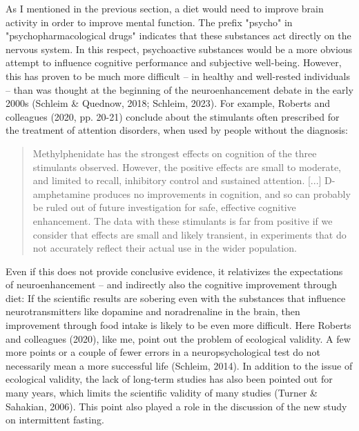 \documentclass[authordate, reflection,issue]{jote-new-article}
\begin{document}
As I mentioned in the previous section, a diet would need to improve brain activity in order to improve mental function. The prefix "psycho" in "psychopharmacological drugs" indicates that these substances act directly on the nervous system. In this respect, psychoactive substances would be a more obvious attempt to influence cognitive performance and subjective well-being. However, this has proven to be much more difficult -- in healthy and well-rested individuals -- than was thought at the beginning of the neuroenhancement debate in the early 2000s (Schleim \& Quednow, 2018; Schleim, 2023). For example, Roberts and colleagues (2020, pp. 20-21) conclude about the stimulants often prescribed for the treatment of attention disorders, when used by people without the diagnosis:






\begin{quote}

  Methylphenidate has the strongest effects on cognition of the three stimulants observed. However, the positive effects are small to moderate, and limited to recall, inhibitory control and sustained attention. [...] D-amphetamine produces no improvements in cognition, and so can probably be ruled out of future investigation for safe, effective cognitive enhancement. The data with these stimulants is far from positive if we consider that effects are small and likely transient, in experiments that do not accurately reflect their actual use in the wider population.

\end{quote}






Even if this does not provide conclusive evidence, it relativizes the expectations of neuroenhancement -- and indirectly also the cognitive improvement through diet: If the scientific results are sobering even with the substances that influence neurotransmitters like dopamine and noradrenaline in the brain, then improvement through food intake is likely to be even more difficult. Here Roberts and colleagues (2020), like me, point out the problem of ecological validity. A few more points or a couple of fewer errors in a neuropsychological test do not necessarily mean a more successful life (Schleim, 2014). In addition to the issue of ecological validity, the lack of long-term studies has also been pointed out for many years, which limits the scientific validity of many studies (Turner \& Sahakian, 2006). This point also played a role in the discussion of the new study on intermittent fasting.
\end{document}

